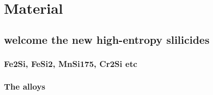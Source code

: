 \chapter{Material}
\label{sec:Material}


\section{welcome the new high-entropy slilicides}

\subsection{Fe2Si, FeSi2, MnSi175, Cr2Si etc}

\subsection{The alloys}